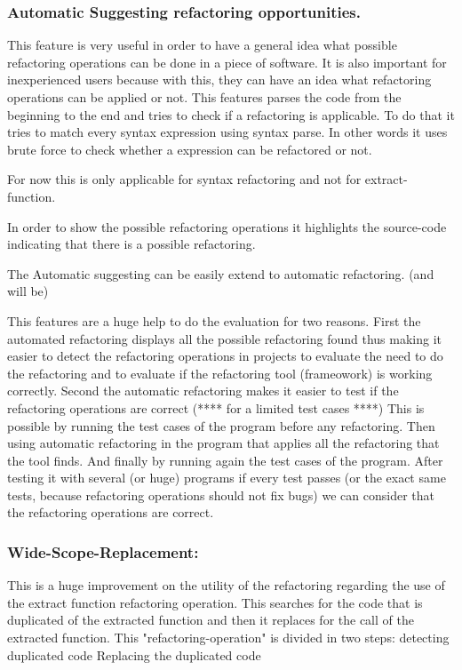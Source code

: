 \subsubsection{Automatic Suggesting refactoring opportunities.}
This feature is very useful in order to have a general idea what possible refactoring
operations can be done in a piece of software. It is also important for inexperienced
users because with this, they can have an idea what refactoring operations can be applied or not.
This features parses the code from the beginning to the end and tries to check if a refactoring is applicable.
To do that it tries to match every syntax expression using syntax parse. In other words it
uses brute force to check whether a expression can be refactored or not.

For now this is only applicable for syntax refactoring and not for extract-function.

In order to show the possible refactoring operations it highlights the source-code indicating
that there is a possible refactoring.

The Automatic suggesting can be easily extend to automatic refactoring. (and will be)

This features are a huge help to do the evaluation for two reasons.
First the automated refactoring displays all the possible refactoring found thus making it easier
to detect the refactoring operations in projects to evaluate the need to do the refactoring and to evaluate
if the refactoring tool (frameowork) is working correctly.
Second the automatic refactoring makes it easier to test if the refactoring operations are correct (**** for a limited test cases ****)
This is possible by running the test cases of the program before any refactoring.
Then using automatic refactoring in the program that applies all the refactoring that the tool finds.
And finally by running again the test cases of the program.
After testing it with several (or huge) programs if every test passes (or the exact same tests, because refactoring operations should not fix bugs)
we can consider that the refactoring operations are correct.


\subsubsection{Wide-Scope-Replacement:}
This is a huge improvement on the utility of the refactoring regarding the use
of the extract function refactoring operation. This searches for the code that is
duplicated of the extracted function and then it replaces for the call of the
extracted function.
This "refactoring-operation" is divided in two steps:
detecting duplicated code
Replacing the duplicated code

